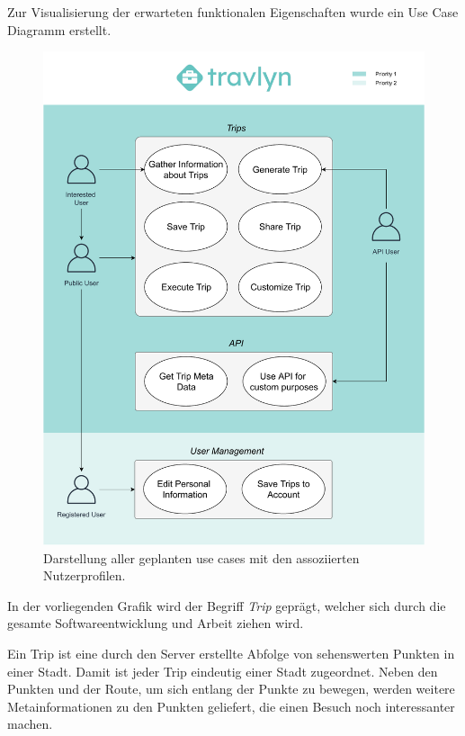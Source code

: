 Zur Visualisierung der erwarteten funktionalen Eigenschaften wurde ein Use Case Diagramm erstellt.
\begin{figure}[H]
	\centering
	\includegraphics[width=1\textwidth]{../ucd/UCD.pdf}
	\caption{Darstellung aller geplanten use cases mit den assoziierten Nutzerprofilen.}
	\label{fig:UCD}
\end{figure}

\newpage

In der vorliegenden Grafik wird der Begriff \textit{Trip} geprägt, welcher sich durch die gesamte Softwareentwicklung und Arbeit ziehen wird.

\begin{defStrich}[Trip]
	Ein Trip ist eine durch den Server erstellte Abfolge von sehenswerten Punkten in einer Stadt. Damit ist jeder Trip eindeutig einer Stadt zugeordnet. Neben den Punkten und der Route, um sich entlang der Punkte zu bewegen, werden weitere Metainformationen zu den Punkten geliefert, die einen Besuch noch interessanter machen.
\end{defStrich} 

